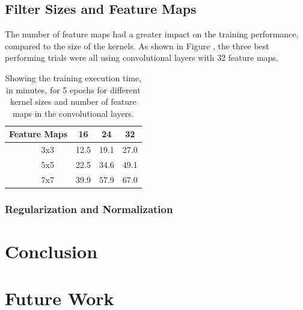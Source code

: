 \documentclass[]{article}
\newcommand*\rot{\rotatebox{90}}
\begin{document}
\subsection{Filter Sizes and Feature Maps}

The number of feature maps had a greater impact on the training performance, compared to the size of the kernels. As shown in Figure , the three best performing trials were all using convolutional layers with 32 feature maps. 

\begin{table}[h]
	\centering
	\caption{Showing the training execution time, in minutes, for 5 epochs for different kernel sizes and number of feature maps in the convolutional layers.}
	\label{my-label}
	\begin{tabular}{@{}ccccc@{}}
		\toprule
		\multicolumn{2}{c}{Feature Maps} & 16 & 24 & 32 \\ \midrule
		\multirow{3}{*}{\rot{Size}} & \multicolumn{1}{c|}{3x3} & 12.5 & 19.1 & 27.0 \\
		& \multicolumn{1}{c|}{5x5} & 22.5 & 34.6 & 49.1 \\
		& \multicolumn{1}{c|}{7x7} & 39.9 & 57.9 & 67.0 \\ \bottomrule
	\end{tabular}
\end{table}



\subsubsection{Regularization and Normalization}

\section{Conclusion}

\section{Future Work}


\clearpage
\medskip


\end{document}
